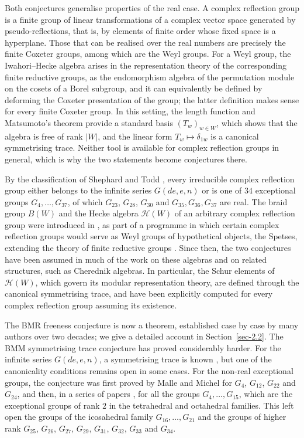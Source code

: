 \documentclass[11pt, reqno]{amsart}
\numberwithin{equation}{section}
\theoremstyle{remark}
\begin{document}
Both conjectures generalise properties of the real case. A complex
reflection group is a finite group of linear transformations of a
complex vector space generated by pseudo-reflections, that is, by
elements of finite order whose fixed space is a hyperplane. Those that
can be realised over the real numbers are precisely the finite Coxeter
groups, among which are the Weyl groups. For a Weyl group, the
Iwahori--Hecke algebra arises in the representation theory of the
corresponding finite reductive groups, as the endomorphism algebra of
the permutation module on the cosets of a Borel subgroup, and it can
equivalently be defined by deforming the Coxeter presentation of the
group; the latter definition makes sense for every finite Coxeter
group. In this setting, the length function and Matsumoto's theorem
provide a standard basis $(T_w)_{w\in W}$, which shows that the algebra
is free of rank $|W|$, and the linear form $T_w\mapsto\delta_{1w}$ is a
canonical symmetrising trace. Neither tool is available for complex
reflection groups in general, which is why the two statements become
conjectures there.

By the classification of Shephard and Todd \cite{ShTo}, every
irreducible complex reflection group either belongs to the infinite
series $G(de,e,n)$ or is one of $34$ exceptional groups
$G_4,\dots,G_{37}$, of which $G_{23}$, $G_{28}$, $G_{30}$ and
$G_{35},G_{36},G_{37}$ are real. The braid group $B(W)$ and the Hecke
algebra $\mathcal H(W)$ of an arbitrary complex reflection group were
introduced in \cite{BMR}, as part of a programme in which certain
complex reflection groups would serve as Weyl groups of hypothetical
objects, the Spetses, extending the theory of finite reductive groups
\cite{BMM}. Since then, the two conjectures have been assumed in much
of the work on these algebras and on related structures, such as
Cherednik algebras. In particular, the Schur elements of
$\mathcal H(W)$, which govern its modular representation theory, are
defined through the canonical symmetrising trace, and have been explicitly computed for every complex reflection group assuming its existence.

The BMR freeness conjecture is now a theorem, established case by case by
many authors over two decades; we give a detailed account in Section~\ref{sec-2.2}.
The BMM symmetrising trace conjecture has proved considerably harder. For the infinite
series $G(de,e,n)$, a symmetrising trace is known \cite{BreMa, MM98}, but one of
the canonicality conditions remains open in some cases.  For the non-real
exceptional groups, the conjecture was first proved by Malle and Michel
\cite{MM10} for $G_4$, $G_{12}$, $G_{22}$ and $G_{24}$, and then, in a
series of papers \cite{BCCK, BCC, ChPf}, for all the groups
$G_4,\dots,G_{15}$, which are the exceptional groups of rank $2$ in the
tetrahedral and octahedral families. This left open the groups of the
icosahedral family $G_{16},\dots,G_{21}$ and the groups of higher rank
$G_{25}$, $G_{26}$, $G_{27}$, $G_{29}$, $G_{31}$, $G_{32}$, $G_{33}$
and $G_{34}$.
\end{document}
